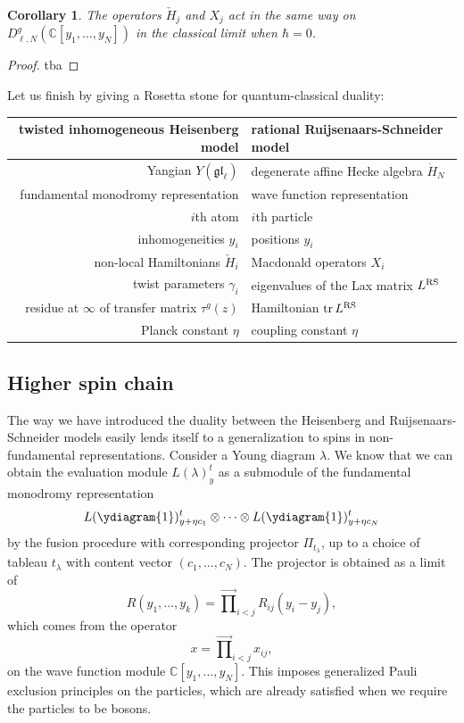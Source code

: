 \documentclass[11pt]{report}
\newtheorem{corollary}[theorem]{Corollary}
\theoremstyle{definition}
\theoremstyle{remark}
\theoremstyle{remark}
\newcommand{\C}{\mathbb{C}}
\begin{document}
\begin{corollary}
The operators $\check H_j$ and $X_j$ act in the same way on $D_{\ell,N}^g(\C[y_1,...,y_N])$ in the classical limit when $\hbar = 0$. 
\end{corollary}

\begin{proof}
tba
\end{proof}

Let us finish by giving a Rosetta stone for quantum-classical duality:
\begin{center}
\begin{tabular}{|r||l|}
\hline
twisted inhomogeneous Heisenberg model & rational Ruijsenaars-Schneider model \\
\hline
Yangian $Y(\mathfrak{gl}_\ell)$ & degenerate affine Hecke algebra $\dot H_N$ \\
fundamental monodromy representation & wave function representation \\
$i$th atom & $i$th particle \\
inhomogeneities $y_i$ & positions $y_i$ \\
non-local Hamiltonians $\check H_i$ & Macdonald operators $X_i$ \\
twist parameters $\gamma_i$ & eigenvalues of the Lax matrix $L^\textnormal{RS}$ \\
residue at $\infty$ of transfer matrix $\tau^g(z)$ & Hamiltonian $\operatorname{tr} L^\textnormal{RS}$ \\
Planck constant $\eta$ & coupling constant $\eta$ \\
\hline
\end{tabular}
\end{center}

\subsection{Higher spin chain}

The way we have introduced the duality between the Heisenberg and Ruijsenaars-Schneider models easily lends itself to a generalization to spins in non-fundamental representations. Consider a Young diagram $\lambda$. We know that we can obtain the evaluation module $L(\lambda)_y^t$ as a submodule of the fundamental monodromy representation
\begin{equation*}
L(\ydiagram{1})_{y+\eta c_1}^t \otimes \cdots \otimes L(\ydiagram{1})_{y+\eta c_N}^t
\end{equation*}
by the fusion procedure with corresponding projector $\Pi_{t_\lambda}$, up to a choice of tableau $t_\lambda$ with content vector $(c_1,...,c_N)$. The projector is obtained as a limit of
\begin{equation*}
R(y_1,...,y_k) = \overset{\longrightarrow}\prod_{i<j} R_{ij}(y_i-y_j),
\end{equation*}
which comes from the operator
\begin{equation*}
x = \overset{\longrightarrow}\prod_{i<j} x_{ij},
\end{equation*}
on the wave function module $\C[y_1,...,y_N]$. This imposes generalized Pauli exclusion principles on the particles, which are already satisfied when we require the particles to be bosons.
\end{document}
